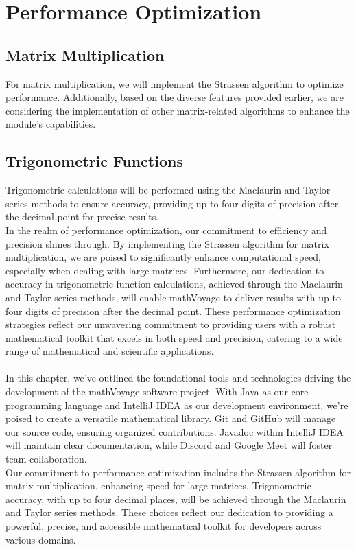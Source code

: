 \section{Performance Optimization}

\subsection{Matrix Multiplication}
For matrix multiplication, we will implement the Strassen algorithm to optimize performance. Additionally, based on the diverse features provided earlier, we are considering the implementation of other matrix-related algorithms to enhance the module's capabilities.

\subsection{Trigonometric Functions}
Trigonometric calculations will be performed using the Maclaurin and Taylor series methods to ensure accuracy, providing up to four digits of precision after the decimal point for precise results.\\

In the realm of performance optimization, our commitment to efficiency and precision shines through. By implementing the Strassen algorithm for matrix multiplication, we are poised to significantly enhance computational speed, especially when dealing with large matrices. Furthermore, our dedication to accuracy in trigonometric function calculations, achieved through the Maclaurin and Taylor series methods, will enable mathVoyage to deliver results with up to four digits of precision after the decimal point. These performance optimization strategies reflect our unwavering commitment to providing users with a robust mathematical toolkit that excels in both speed and precision, catering to a wide range of mathematical and scientific applications.\\\\

In this chapter, we've outlined the foundational tools and technologies driving the development of the mathVoyage software project. With Java as our core programming language and IntelliJ IDEA as our development environment, we're poised to create a versatile mathematical library. Git and GitHub will manage our source code, ensuring organized contributions. Javadoc within IntelliJ IDEA will maintain clear documentation, while Discord and Google Meet will foster team collaboration.\\

Our commitment to performance optimization includes the Strassen algorithm for matrix multiplication, enhancing speed for large matrices. Trigonometric accuracy, with up to four decimal places, will be achieved through the Maclaurin and Taylor series methods. These choices reflect our dedication to providing a powerful, precise, and accessible mathematical toolkit for developers across various domains.